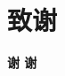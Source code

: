 \section*{致谢}

\begin{frame}
        \begin{center}
                \Huge{\textbf{谢 \quad 谢}}
        \end{center}
\end{frame}
